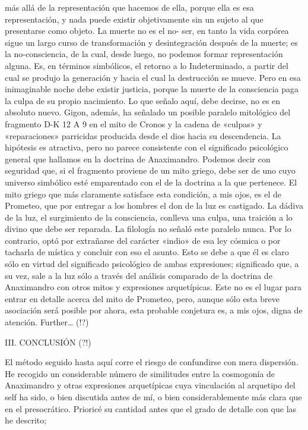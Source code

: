 \documentclass[a4paper]{article}
\begin{document}
más allá de la representación que hacemos de ella, porque ella es esa
representación, y nada puede existir objetivamente sin un sujeto al que
presentarse como objeto. La muerte no es el no- ser, en tanto la vida corpórea
sigue un largo curso de transformación y desintegración después de la muerte; es
la no-consciencia, de la cual, desde luego, no podemos formar representación
alguna. Es, en términos simbólicos, el retorno a lo Indeterminado, a partir del
cual se produjo la generación y hacia el cual la destrucción se mueve. Pero en
esa inimaginable noche debe existir justicia, porque la muerte de la consciencia
paga la culpa de su propio nacimiento. Lo que señalo aquí, debe decirse, no es
en absoluto nuevo. Gigon, además, ha señalado un posible paralelo mitológico del
fragmento D-K 12 A 9 en el mito de Cronos y la cadena de «culpas» y
«reparaciones» parricidas producida desde el dios hacia su descendencia. La
hipótesis es atractiva, pero no parece consistente con el significado
psicológico general que hallamos en la doctrina de Anaximandro. Podemos decir
con seguridad que, si el fragmento proviene de un mito griego, debe ser de uno
cuyo universo simbólico esté emparentado con el de la doctrina a la que
pertenece. El mito griego que más claramente satisface esta condición, a mis
ojos, es el de Prometeo, que por entregar a los hombres el don de la luz es
castigado. La dádiva de la luz, el surgimiento de la consciencia, conlleva una
culpa, una traición a lo divino que debe ser reparada. La filología no señaló
este paralelo nunca. Por lo contrario, optó por extrañarse del carácter «indio»
de esa ley cósmica o por tacharla de mística y concluir con eso el asunto. Esto
se debe a que él es claro sólo en virtud del significado psicológico de ambas
expresiones; significado que, a su vez, sale a la luz sólo a través del análisis
comparado de la doctrina de Anaximandro con otros mitos y expresiones
arquetípicas. Este no es el lugar para entrar en detalle acerca del mito de
Prometeo, pero, aunque sólo esta breve asociación será posible por ahora, esta
probable conjetura es, a mis ojos, digna de atención. Further… (!?)

III. CONCLUSIÓN (?!)

El método seguido hasta aquí corre el riesgo de confundirse con mera dispersión.
He recogido un considerable número de similitudes entre la cosmogonía de
Anaximandro y otras expresiones arquetípicas cuya vinculación al arquetipo del
self ha sido, o bien discutida antes de mí, o bien considerablemente más clara
que en el presocrático. Prioricé su cantidad antes que el grado de detalle con
que las he descrito;
\end{document}
